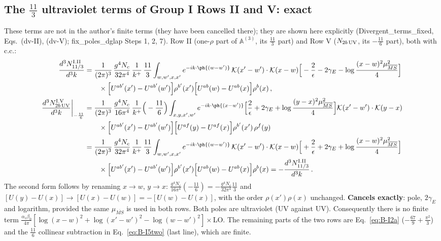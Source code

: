 \subsection{The $\frac{11}{3}$ ultraviolet terms of Group I Rows II and V: exact}\label{sec:C2}
These terms are not in the author's finite terms (they have been cancelled there); they are shown here explicitly (Divergent\_terms\_fixed, Eqs.~(dv-II), (dv-V); fix\_poles\_dglap Steps 1, 2, 7). Row II (one-$\rho$ part of $\mathbb{A}^{(3)}$, its $\frac{11}{3}$ part) and Row V ($N_{2b\,\rm UV}$, its $-\frac{11}{6}$ part), both with c.c.:
\begingroup\color{cUV}
\begin{align}
\frac{d^{3}N^{\rm I.II}_{11/3}}{d^{3}k}&=\frac{1}{(2\pi)^{3}}\,\frac{g^{4}N_{c}}{32\pi^{4}}\,\frac{1}{k^{+}}\,\frac{11}{3}\int_{w,w',x,x'}e^{-ik\cdot\ph{(w-w')}}\,\mathcal{K}(x'-w')\cdot\mathcal{K}(x-w)\Big[-\frac{2}{\epsilon}-2\gamma_{E}-\log\frac{(x-w)^{2}\mu^{2}_{\overline{MS}}}{4}\Big]\notag\\
&\qquad\times\Big[U^{ab'}(x')-U^{ab'}(w')\Big]\rho^{b'}(x')\Big[U^{ab}(w)-U^{ab}(x)\Big]\rho^{b}(x)\,,\label{eq:C-UV2}\\
\frac{d^{3}N^{\rm I.V}_{2b\,\rm UV}}{d^{3}k}\bigg|_{-\frac{11}{6}}&=\frac{1}{(2\pi)^{3}}\,\frac{g^{4}N_{c}}{16\pi^{4}}\,\frac{1}{k^{+}}\Big(-\frac{11}{6}\Big)\int_{x,y,x',w'}e^{-ik\cdot\ph{(x-w')}}\Big[\frac{2}{\epsilon}+2\gamma_{E}+\log\frac{(y-x)^{2}\mu^{2}_{\overline{MS}}}{4}\Big]\mathcal{K}(x'-w')\cdot\mathcal{K}(y-x)\notag\\
&\qquad\times\Big[U^{ab'}(x')-U^{ab'}(w')\Big]\Big[U^{af}(y)-U^{af}(x)\Big]\rho^{b'}(x')\,\rho^{f}(y)\label{eq:C-UV5}\\
&=\frac{1}{(2\pi)^{3}}\,\frac{g^{4}N_{c}}{32\pi^{4}}\,\frac{1}{k^{+}}\,\frac{11}{3}\int_{w,w',x,x'}e^{-ik\cdot\ph{(w-w')}}\,\mathcal{K}(x'-w')\cdot\mathcal{K}(x-w)\Big[+\frac{2}{\epsilon}+2\gamma_{E}+\log\frac{(x-w)^{2}\mu^{2}_{\overline{MS}}}{4}\Big]\notag\\
&\qquad\times\Big[U^{ab'}(x')-U^{ab'}(w')\Big]\rho^{b'}(x')\Big[U^{ab}(w)-U^{ab}(x)\Big]\rho^{b}(x)=-\frac{d^{3}N^{\rm I.II}_{11/3}}{d^{3}k}\,.\notag
\end{align}
\endgroup
\noindent The second form follows by renaming $x\to w$, $y\to x$: $\frac{g^{4}N_{c}}{16\pi^{4}}(-\frac{11}{6})=-\frac{g^{4}N_{c}}{32\pi^{4}}\frac{11}{3}$ and $[U(y)-U(x)]\to[U(x)-U(w)]=-[U(w)-U(x)]$, with the order $\rho(x')\rho(x)$ unchanged. \textbf{Cancels exactly}: pole, $2\gamma_{E}$ and logarithm, provided the same $\mu_{\overline{MS}}$ is used in both rows. Both poles are ultraviolet (UV against UV). Consequently there is no finite term $\frac{\alpha_{s}\beta_{0}}{4\pi}[\log(x-w)^{2}+\log(x'-w')^{2}-\log(w-w')^{2}]\times$LO. The remaining parts of the two rows are Eq.~\eqref{eq:B-I2a} ($-\frac{67}{9}+\frac{\pi^{2}}{3}$) and the $\frac{11}{6}$ collinear subtraction in Eq.~\eqref{eq:B-I5two} (last line), which are finite.

